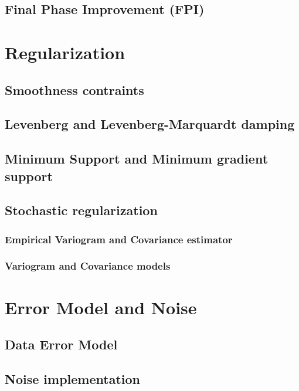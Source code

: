 \documentclass[12pt,a4paper,twoside,titlepage,draft]{book}
\theoremstyle{aufgaben}
\theoremstyle{remark}
\begin{document}
\subsection{Final Phase Improvement (FPI)}\label{sub:crtomo_fpi}
\clearpage
\section{Regularization}\label{sect:crtomo_reg}
\subsection{Smoothness contraints}\label{sub:crtomo_reg_smooth}
\subsection{Levenberg and Levenberg-Marquardt damping}\label{sub:crtomo_reg_lma}
\subsection{Minimum Support and Minimum gradient support}\label{sub:crtomo_reg_mgs}
\subsection{Stochastic regularization}\label{sub:crtomo_reg_sto}
\subsubsection{Empirical Variogram and Covariance estimator}\label{ssub:crtomo_reg_sto_empvar}
\subsubsection{Variogram and Covariance models}\label{ssub:crtomo_reg_sto_var}
\clearpage
\section{Error Model and Noise}\label{sct:cortomo_errmod}
\subsection{Data Error Model}\label{sct:cortomo_data_errmod}
\subsection{Noise implementation}\label{sct:cortomo_noise_errmod}
\clearpage
\end{document}
